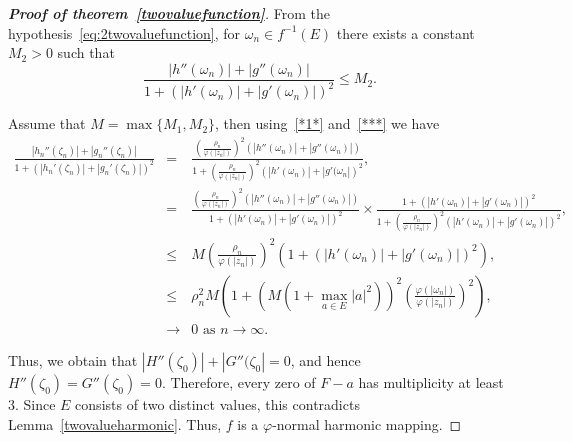 \documentclass[10pt,a4paper]{amsart}
\numberwithin{equation}{section}
\begin{document}
\begin{proof}[\bf{Proof of theorem~\ref{twovaluefunction}}]
From the hypothesis~\ref{eq:2twovaluefunction}, for 
$\omega_n\in f^{-1}(E)$ there exists a constant $M_2>0$ such that
\begin{equation}\label{***}
  \frac{|h''(\omega_n)|+|g''(\omega_n)|}
{1+(|h'(\omega_n)|+|g'(\omega_n)|)^2}\leq M_2.
\end{equation}

Assume that $M=\max\{M_1, M_2\}$, then using~\eqref{*1*} and~\eqref{***} we have
\begin{eqnarray*}
  \frac{|h_n''(\zeta_n)|+|g_n''(\zeta_n)|}
  {1+(|h_n'(\zeta_n)|+|g_n'(\zeta_n)|)^2} 
  &=& \frac{\left(\frac{\rho_n}{\varphi(|z_n|)}
  \right)^2\left(|h''(\omega_n)|
  +|g''(\omega_n)|\right)}{1+\left(\frac{\rho_n}
  {\varphi(|z_n|)}\right)^2\left(|h'(\omega_n)|+
  |g'(\omega_n|\right)^2}, \\
  &=& \frac{\left(\frac{\rho_n}{\varphi(|z_n|)}\right)^2
  \left(|h''(\omega_n)|+|g''(\omega_n)|\right)}
  {1+\left(|h'(\omega_n)|+|g'(\omega_n)|\right)^2}\!\times\!
  \frac{1+\left(|h'(\omega_n)|+|g'(\omega_n)|\right)^2}
  {1+\left(\frac{\rho_n}{\varphi(|z_n|)}\right)^2
  \left(|h'(\omega_n)|+|g'(\omega_n)|\right)^2}, \\
   &\leq& M \left(\frac{\rho_n}{\varphi(|z_n|)}\right)^2
   (1+\left(|h'(\omega_n)|+|g'(\omega_n)|\right)^2),\\
  &\leq& \rho_n^2 M \left(1+(M(1+\max_{a\in E}|a|^2))^2\left(\frac{\varphi(|\omega_n|)}
  {\varphi(|z_n|)}\right)^2\right), \\
  &\to & 0 \,\, \text{as}\,\, n \to \infty.
\end{eqnarray*}

Thus, we obtain that $|H''(\zeta_0)|+|G''(\zeta_0|=0$, and hence
 $H''(\zeta_0)=G''(\zeta_0)=0$. Therefore, every
 zero of $F-a$ has multiplicity at least 3. Since $E$ consists of 
 two distinct values, this contradicts Lemma~\ref{twovalueharmonic}.
Thus, $f$ is a $\varphi$-normal harmonic mapping.  
\end{proof}
\medskip
\end{document}
